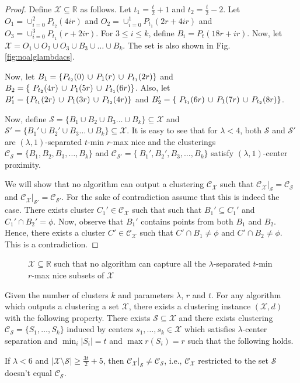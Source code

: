 \documentclass[anon,12pt]{colt2016} %
\newcommand{\mc}{\mathcal}
\begin{document}
\begin{proof}
Define $\mc X \subseteq \mathbb{R}$ as follows. Let $t_1 = \frac{t}{2}+1$ and $t_2 = \frac{t}{2}-2$. Let $O_1 = \cup_{i=0}^2 P_{t_2}(4ir)$ and $O_2 = \cup_{i=0}^1 P_{t_1}(2r+4ir)$ and $O_3 = \cup_{i=0}^3 P_{t_1}(r+2ir)$. For $3\le i\le k$, define $B_i = P_t(18r+ir)$. Now, let $\mc X = O_1 \cup O_2 \cup O_3 \cup B_3 \cup \ldots \cup B_k$. The set is also shown in Fig. \ref{fig:noalglambdacs}.

Now, let $B_1 = \{P_{t_2}(0) \thinspace\cup\thinspace  P_{1}(r) \thinspace\cup\thinspace P_{t_1}(2r) \}$ and $B_2 = \{\ P_{t_2}(4r) \thinspace\cup\thinspace P_{1}(5r)\thinspace\cup\thinspace P_{t_1}(6r)\}$. Also, let $B_1' = \{P_{t_1}(2r) \thinspace\cup\thinspace  P_{1}(3r) \thinspace\cup\thinspace P_{t_2}(4r) \}$ and $B_2' = \{\ P_{t_1}(6r) \thinspace\cup\thinspace P_{1}(7r)\thinspace\cup\thinspace P_{t_2}(8r)\}$.

Now, define $\mc S = \{B_1 \cup B_2 \cup B_3\ldots \cup B_k\} \subseteq \mc X$ and $\mc S' = \{B_1' \cup B_2' \cup B_3\ldots \cup B_k\} \subseteq \mc X$. It is easy to see that for $\lambda < 4$, both $\mc S$ and $\mc S'$ are $(\lambda, 1)$-separated $t$-min $r$-max nice and the clusterings $\mc C_{\mc S} = \{B_1, B_2, B_3, \ldots, B_k\}$ and $\mc C_{\mc S'} = \{\ B_1', B_2', B_3, \ldots, B_k\}$ satisfy $(\lambda, 1)$-center proximity. 

We will show that no algorithm can output a clustering $\mc C_{\mc X}$ such that $\mc C_{\mc X}|_{\mc S} = \mc C_{\mc S}$ and $\mc C_{\mc X}|_{\mc S'} = \mc C_{\mc S'}$. For the sake of contradiction assume that this is indeed the case. There exists cluster $C_1' \in \mc C_{\mc X}$ such that such that $B_1' \subseteq C_1'$ and $C_1' \cap B_2' = \phi$. Now, observe that $B_1'$ contains points from both $B_1$ and $B_2$. Hence, there exists a cluster $C' \in \mc C_{\mc X}$ such that $C' \cap B_1 \neq \phi$ and $C' \cap B_2 \neq \phi$. This is a contradiction.
\end{proof}

\begin{figure}[!ht]

\caption{$\mc X \subseteq \mathbb{R}$ such that no algorithm can capture all the $\lambda$-separated $t$-min $r$-max nice subsets of $\mc X$}
\label{fig:nosparsealglambdacs}
\end{figure}

\begin{theorem}
Given the number of clusters $k$ and parameters $\lambda$, $r$ and $t$. For any algorithm which outputs a clustering a set $\mc X$, there exists a clustering instance $(\mc X, d)$ with the following property. There exists $\mc S \subseteq \mc X$ and there exists clustering $\mc C_{\mc S} = \{S_1, \ldots, S_k\}$ induced by centers $s_1, \ldots, s_k \in \mc X$ which satisfies $\lambda$-center separation and $\min_i |S_i| = t$ and $\max r(S_i) = r$ such that the following holds.

If $\lambda < 6$ and $|\mc X\setminus \mc S|\ge \frac{3t}{2}+5$, then $\mc C_{\mc X}|_{\mc S} \neq \mc C_{\mc S}$, i.e., $\mc C_{\mc X}$ restricted to the set $\mc S$ doesn't equal $\mc C_{\mc S}$.
\end{theorem}
\end{document}
